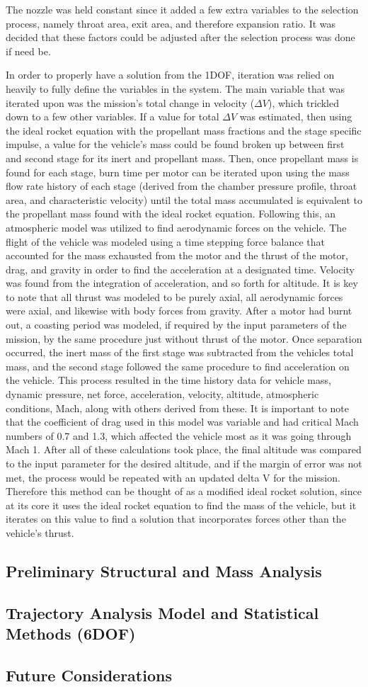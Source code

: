 The nozzle was held constant since it added a few extra variables to the selection process, namely throat area, exit area, and therefore expansion ratio. It was decided that these factors could be adjusted after the selection process was done if need be.

In order to properly have a solution from the 1DOF, iteration was relied on heavily to fully define the variables in the system. The main variable that was iterated upon was the mission’s total change in velocity (\(\Delta V\)), which trickled down to a few other variables. If a value for total \(\Delta V\) was estimated, then using the ideal rocket equation with the propellant mass fractions and the stage specific impulse, a value for the vehicle's mass could be found broken up between first and second stage for its inert and propellant mass. Then, once propellant mass is found for each stage, burn time per motor can be iterated upon using the mass flow rate history of each stage (derived from the chamber pressure profile, throat area, and characteristic velocity) until the total mass accumulated is equivalent to the propellant mass found with the ideal rocket equation. Following this, an atmospheric model was utilized to find aerodynamic forces on the vehicle. The flight of the vehicle was modeled using a time stepping force balance that accounted for the mass exhausted from the motor and the thrust of the motor, drag, and gravity in order to find the acceleration at a designated time. Velocity was found from the integration of acceleration, and so forth for altitude. It is key to note that all thrust was modeled to be purely axial, all aerodynamic forces were axial, and likewise with body forces from gravity. After a motor had burnt out, a coasting period was modeled, if required by the input parameters of the mission, by the same procedure just without thrust of the motor. Once separation occurred, the inert mass of the first stage was subtracted from the vehicles total mass, and the second stage followed the same procedure to find acceleration on the vehicle. This process resulted in the time history data for vehicle mass, dynamic pressure, net force, acceleration, velocity, altitude, atmospheric conditions, Mach, along with others derived from these. It is important to note that the coefficient of drag used in this model was variable and had critical Mach numbers of 0.7 and 1.3, which affected the vehicle most as it was going through Mach 1. After all of these calculations took place, the final altitude was compared to the input parameter for the desired altitude, and if the margin of error was not met, the process would be repeated with an updated delta V for the mission. Therefore this method can be thought of as a modified ideal rocket solution, since at its core it uses the ideal rocket equation to find the mass of the vehicle, but it iterates on this value to find a solution that incorporates forces other than the vehicle's thrust.


\subsection{Preliminary Structural and Mass Analysis}
\subsection{Trajectory Analysis Model and Statistical Methods (6DOF)}
\subsection{Future Considerations}
